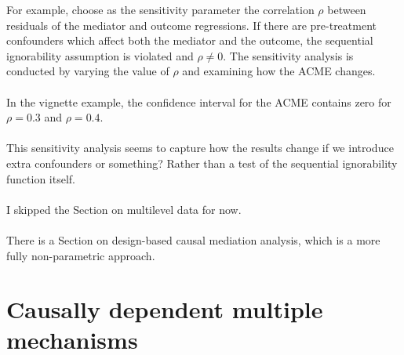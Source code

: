\documentclass{article}
\begin{document}
	For example, choose as the sensitivity parameter the correlation $\rho$ between residuals of the mediator and outcome regressions. If there are pre-treatment confounders which affect both the mediator and the outcome, the sequential ignorability assumption is violated and $\rho \neq 0$. The sensitivity analysis is conducted by varying the value of $\rho$ and examining how the ACME changes. 
	\\~\\
	In the vignette example, the confidence interval for the ACME contains zero for $\rho = 0.3$ and $\rho = 0.4$. 
	\\~\\
	This sensitivity analysis seems to capture how the results change if we introduce extra confounders or something? Rather than a test of the sequential ignorability function itself. 
	\\~\\ 
	I skipped the Section on multilevel data for now. 
	\\~\\
	There is a Section on design-based causal mediation analysis, which is a more fully non-parametric approach. 
	
	\section{Causally dependent multiple mechanisms}
	
\end{document}
